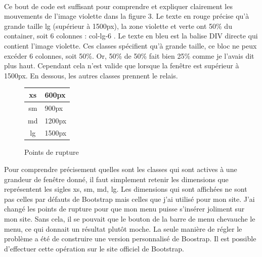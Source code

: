 \documentclass{article}
\begin{document}
\vspace{0.5cm}\\
Ce bout de code est suffisant pour comprendre et expliquer clairement les mouvements de l'image violette dans la figure 3. Le texte en rouge pr\'ecise qu'\`a grande taille lg (sup\'erieur \`a 1500px), la zone violette et verte ont 50\% du container, soit 6 colonnes : \og col-lg-6 \fg{} . Le texte en bleu est la balise DIV directe qui contient l'image violette. Ces classes sp\'ecifient qu'\`a grande taille, ce bloc ne peux exc\'eder 6 colonnes, soit 50\%. Or, 50\% de 50\% fait bien 25\% comme je l'avais dit plus haut. Cependant cela n'est valide que lorsque la fen\^etre est sup\'erieur \`a 1500px. En dessous, les autres classes prennent le relais.\\ 

\begin{figure}
  \vspace{-20pt}
  \begin{center}
    \begin{tabular*}{0.48\textwidth}{@{\extracolsep{\fill}} | c | l | }
  \hline
  xs & 600px\\
  \hline
  sm & 900px\\
  \hline
  md & 1200px\\
  \hline
  lg & 1500px\\
  \hline
\end{tabular*}
  \end{center}
  \vspace{-20pt}
  \caption{Points de rupture}
  \vspace{-10pt}
\end{figure} 

Pour comprendre pr\'ecisement quelles sont les classes qui sont actives \`a une grandeur de fen\^etre donn\'e, il faut simplement retenir les dimensions que repr\'esentent les sigles xs, sm, md, lg. Les dimensions qui sont affich\'ees ne sont pas celles par d\'efauts de Bootstrap mais celles que j'ai utilis\'e pour mon site. J'ai chang\'e les points de rupture pour que mon menu puisse s'ins\'erer joliment sur mon site. Sans cela, il se pouvait que le bouton de la barre de menu chevauche le menu, ce qui donnait un r\'esultat plut\^ot moche. La seule mani\`ere de r\'egler le probl\`eme a \'et\'e de construire une version personnalis\'e de Boostrap. Il est possible d'effectuer cette op\'eration sur le site officiel de Bootstrap.\\
\end{document}
